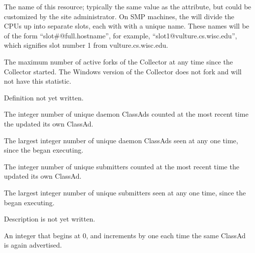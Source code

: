 \begin{description}
\item[\AdAttr{Name}:] The name of this resource; typically the same value as
  the  attribute, but could be customized by the site
  administrator.
  On SMP machines, the  will divide the CPUs up into separate
  slots, each with with a unique name.
  These names will be of the form ``slot\#@full.hostname'', for example,
  ``slot1@vulture.cs.wisc.edu'', which signifies slot number 1 from
  vulture.cs.wisc.edu.

\item[\AdAttr{CondorVersion}:] The maximum number of active forks of the Collector at any time since the Collector started.
The Windows version of the Collector does not fork and will not have this statistic.

\item[\AdAttr{RunningJobs}:] Definition not yet written.

\item[\AdAttr{StartdAds}:] The integer number of unique 
  daemon ClassAds counted at the most recent time the 
  updated its own ClassAd.

\item[\AdAttr{StartdAdsPeak}:] The largest integer number of unique 
   daemon ClassAds seen at any one time, 
  since the  began executing.

\item[\AdAttr{SubmitterAds}:] The integer number of unique submitters 
  counted at the most recent time the  
  updated its own ClassAd.

\item[\AdAttr{SubmitterAdsPeak}:] The largest integer number of unique 
  submitters seen at any one time, 
since the  began executing.

\item[\AdAttr{UpdateInterval}:] Description is not yet written.

\item[\AdAttr{UpdateSequenceNumber}:] An integer that begins at 0,
   and increments by one each time the same ClassAd is again advertised.


\end{description}
